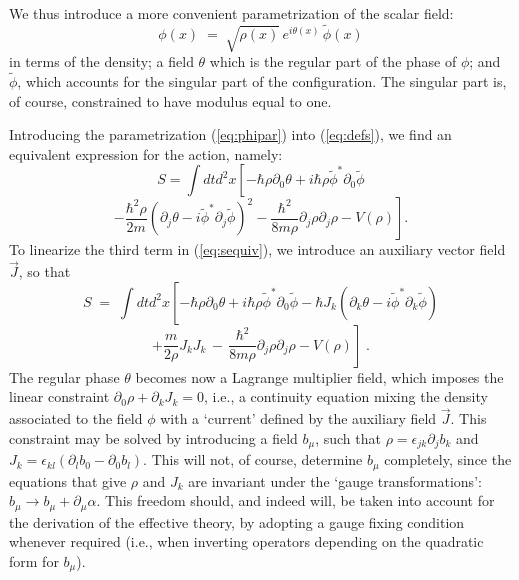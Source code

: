 \documentclass[a4paper,12pt]{article} \tolerance=200
\begin{document}
We thus introduce a more convenient
parametrization of the scalar field:
\begin{equation}\label{eq:phipar}
\phi(x) \;=\; \sqrt{\rho (x)} \, e^{i \theta (x)} \, {\tilde \phi}(x)
\end{equation}
in terms of the density; a field $\theta$ which is the regular part of
the phase of $\phi$; and ${\tilde \phi}$, which accounts for the
singular part of the configuration. The singular part is, of course,
constrained to have modulus equal to one.

Introducing the parametrization (\ref{eq:phipar}) into
(\ref{eq:defs}), we find an equivalent expression for the action,
namely:
$$
S=\int dt d^2x \left[- \hbar \rho \partial_0 \theta + i \hbar \rho {\tilde \phi}^* \partial_0 {\tilde \phi} \right.
$$
\begin{equation}\label{eq:sequiv}
\left. - \frac{\hbar^2\rho}{2 m} (\partial_j \theta - i {\tilde \phi}^* \partial_j {\tilde \phi})^2 -
\frac{\hbar^2}{8 m \rho} \partial_j \rho \partial_j \rho - V(\rho) \right].
\end{equation}
To linearize the third term in (\ref{eq:sequiv}), we introduce an 
auxiliary
vector field ${\vec J}$, so that
$$
S\;=\; \int dt d^2x \left[- \hbar \rho \partial_0 \theta + i \hbar
\rho {\tilde \phi}^* \partial_0 {\tilde \phi} - \hbar J_k (\partial_k
\theta - i {\tilde \phi}^* \partial_k {\tilde \phi}) \right.
$$
\begin{equation}\label{eq:sequiv1}
\left. + \frac{m}{2 \rho} J_k J_k \,-\,\frac{\hbar^2}{8 m \rho}
\partial_j \rho \partial_j \rho - V(\rho) \right]\;.
\end{equation}
The regular phase $\theta$ becomes now a Lagrange multiplier field,
which imposes the linear constraint $\partial_0 \rho + \partial_k J_k
= 0$, i.e., a continuity equation mixing the density associated to the
field $\phi$ with a `current' defined by the auxiliary field ${\vec
J}$. This constraint may be solved by introducing a field $b_\mu$,
such that $\rho=\epsilon_{jk}\partial_j b_k$ and
$J_k=\epsilon_{kl}(\partial_l b_0 - \partial_0 b_l)$. This will not,
of course, determine $b_\mu$ completely, since the equations that give
$\rho$ and $J_k$ are invariant under the `gauge transformations':
$b_\mu \to b_\mu + \partial_\mu \alpha$.  This freedom should, and
indeed will, be taken into account for the derivation of the effective
theory, by adopting a gauge fixing condition whenever required (i.e.,
when inverting operators depending on the quadratic form for $b_\mu$).
\end{document}
